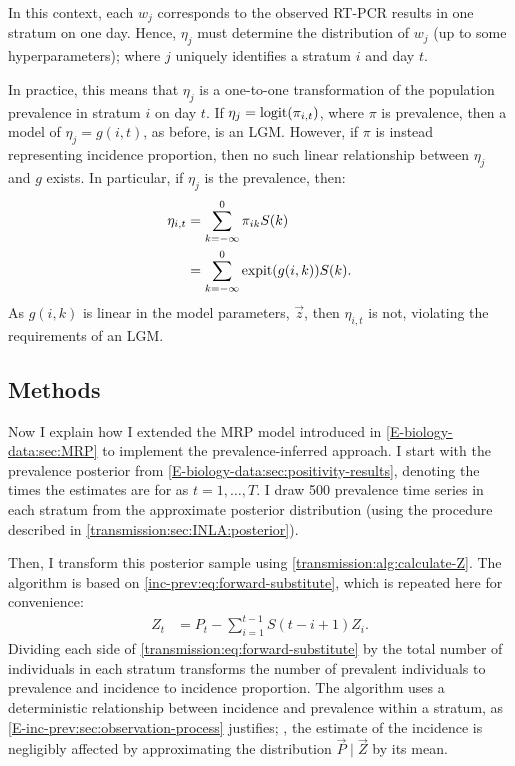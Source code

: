 \documentclass[thesis.tex]{subfiles}
\begin{document}
In this context, each $w_j$ corresponds to the observed RT-PCR results in one stratum on one day.
Hence, $\eta_{j}$ must determine the distribution of $w_{j}$ (up to some hyperparameters); where $j$ uniquely identifies a stratum $i$ and day $t$.

In practice, this means that $\eta_j$ is a one-to-one transformation of the population prevalence in stratum $i$ on day $t$.
If $\eta_j = \operatorname{logit}(\pi_{i,t})$, where $\pi$ is prevalence, then a model of $\eta_j = g(i, t)$, as before, is an LGM.
However, if $\pi$ is instead representing incidence proportion, then no such linear relationship between $\eta_j$ and $g$ exists.
In particular, if $\eta_j$ is the prevalence, then:
\begin{align}
    \eta_{i,t}
    &= \sum_{k=-\infty}^0 \pi_{ik} S(k) \\
    &= \sum_{k=-\infty}^0 \operatorname{expit}(g(i, k)) S(k).
\end{align}
As $g(i, k)$ is linear in the model parameters, $\vec{z}$, then $\eta_{i,t}$ is not, violating the requirements of an LGM.


\subsection{Methods} \label{backcalc:sec:methods}

Now I explain how I extended the MRP model introduced in \cref{E-biology-data:sec:MRP} to implement the prevalence-inferred approach.
I start with the prevalence posterior from \cref{E-biology-data:sec:positivity-results}, denoting the times the estimates are for as $t = 1, \dots, T$.
I draw 500 prevalence time series in each stratum from the approximate posterior distribution (using the procedure described in \cref{transmission:sec:INLA:posterior}).

Then, I transform this posterior sample using \cref{transmission:alg:calculate-Z}.
The algorithm is based on \cref{inc-prev:eq:forward-substitute}, which is repeated here for convenience:
\begin{align}
Z_t
&= P_t - \sum_{i=1}^{t-1} S(t - i + 1) Z_i.
\label{transmission:eq:forward-substitute}
\end{align}
Dividing each side of \cref{transmission:eq:forward-substitute} by the total number of individuals in each stratum transforms the number of prevalent individuals to prevalence and incidence to incidence proportion.
The algorithm uses a deterministic relationship between incidence and prevalence within a stratum, as \cref{E-inc-prev:sec:observation-process} justifies; \ie, the estimate of the incidence is negligibly affected by approximating the distribution $\vec{P} \mid \vec{Z}$ by its mean.
\end{document}
